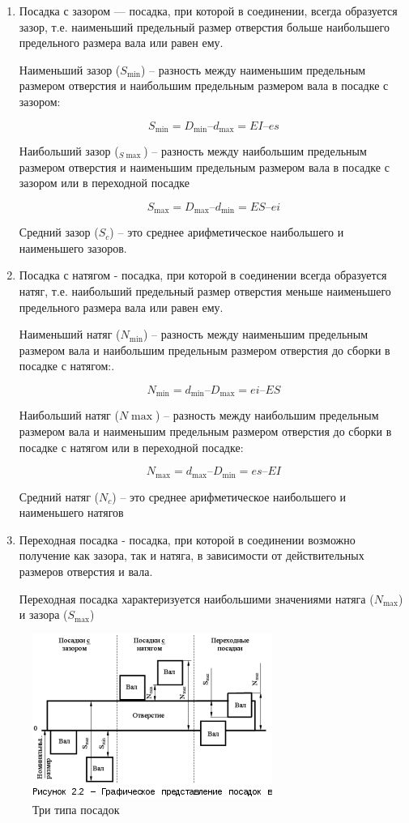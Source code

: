 \begin{enumerate}
	\item Посадка с зазором --- посадка, при которой в соединении, всегда образуется зазор, т.е. наименьший предельный размер отверстия больше наибольшего предельного размера вала или равен ему.
	
	Наименьший зазор ($S_{\min}$) – разность между наименьшим предельным размером отверстия и наибольшим предельным размером вала в посадке с зазором:
	
	$$S_{\min} = D_{\min} – d_{\max} = EI – es$$
	
	Наибольший зазор ($_{S\max}$) – разность между наибольшим предельным размером отверстия и наименьшим предельным размером вала в посадке с зазором или в переходной посадке
	
	$$S_{\max} = D_{\max} – d_{\min} = ES – ei$$
	
	Средний зазор ($S_c$) – это среднее арифметическое наибольшего и наименьшего зазоров.
	
	\item Посадка с натягом - посадка, при которой в соединении всегда образуется натяг, т.е. наибольший предельный размер отверстия меньше наименьшего предельного размера вала или равен ему.
	
	Наименьший натяг ($N_{\min}$) – разность между наименьшим предельным размером вала и наибольшим предельным размером отверстия до сборки в посадке с натягом:.
	
	$$N_{\min} = d_{\min} – D_{\max} = ei – ES$$
	
	Наибольший натяг ($N\max$) – разность между наибольшим предельным размером вала и наименьшим предельным размером отверстия до сборки в посадке с натягом или в переходной посадке:
	
	$$N_{\max} = d_{\max} – D_{\min} = es – EI$$
	
	Средний натяг ($N_c$) – это среднее арифметическое наибольшего и наименьшего натягов
	
	\item 	Переходная посадка - посадка, при которой в соединении возможно получение как зазора, так и натяга, в зависимости от действительных размеров отверстия и вала.
	
	Переходная посадка характеризуется наибольшими значениями натяга ($N_{\max}$) и зазора ($S_{\max}$)
\end{enumerate}

\begin{figure}
	\centering
	\includegraphics[width=0.7\linewidth]{pic/1_4}
	\caption{Три типа посадок}
	\label{fig:14}
\end{figure}


